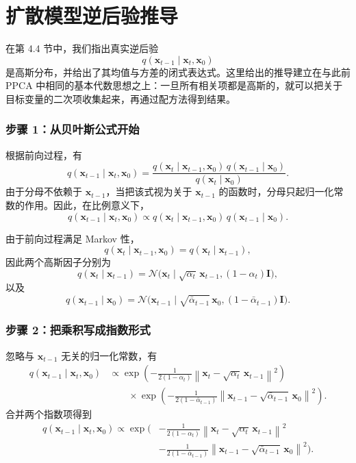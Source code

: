 \chapter{扩散模型逆后验推导}
\label{app:diffusion-posterior}

在第 4.4 节中，我们指出真实逆后验
\[
q(\mathbf{x}_{t-1}\mid \mathbf{x}_t,\mathbf{x}_0)
\]
是高斯分布，并给出了其均值与方差的闭式表达式。这里给出的推导建立在与此前 PPCA 中相同的基本代数思想之上：一旦所有相关项都是高斯的，就可以把关于目标变量的二次项收集起来，再通过配方法得到结果。

\subsection*{步骤 1：从贝叶斯公式开始}

根据前向过程，有
\[
q(\mathbf{x}_{t-1}\mid \mathbf{x}_t,\mathbf{x}_0)
=
\frac{
q(\mathbf{x}_t\mid \mathbf{x}_{t-1},\mathbf{x}_0)\,
q(\mathbf{x}_{t-1}\mid \mathbf{x}_0)
}{
q(\mathbf{x}_t\mid \mathbf{x}_0)
}.
\]
由于分母不依赖于 \(\mathbf{x}_{t-1}\)，当把该式视为关于 \(\mathbf{x}_{t-1}\) 的函数时，分母只起归一化常数的作用。因此，在比例意义下，
\[
q(\mathbf{x}_{t-1}\mid \mathbf{x}_t,\mathbf{x}_0)
\propto
q(\mathbf{x}_t\mid \mathbf{x}_{t-1},\mathbf{x}_0)\,
q(\mathbf{x}_{t-1}\mid \mathbf{x}_0).
\]

由于前向过程满足 Markov 性，
\[
q(\mathbf{x}_t\mid \mathbf{x}_{t-1},\mathbf{x}_0)
=
q(\mathbf{x}_t\mid \mathbf{x}_{t-1}),
\]
因此两个高斯因子分别为
\[
q(\mathbf{x}_t\mid \mathbf{x}_{t-1})
=
\mathcal{N}\!\bigl(
\mathbf{x}_t\mid
\sqrt{\alpha_t}\,\mathbf{x}_{t-1},
(1-\alpha_t)\mathbf{I}
\bigr),
\]
以及
\[
q(\mathbf{x}_{t-1}\mid \mathbf{x}_0)
=
\mathcal{N}\!\bigl(
\mathbf{x}_{t-1}\mid
\sqrt{\bar{\alpha}_{t-1}}\,\mathbf{x}_0,
(1-\bar{\alpha}_{t-1})\mathbf{I}
\bigr).
\]

\subsection*{步骤 2：把乘积写成指数形式}

忽略与 \(\mathbf{x}_{t-1}\) 无关的归一化常数，有
\[
\begin{aligned}
q(\mathbf{x}_{t-1}\mid \mathbf{x}_t,\mathbf{x}_0)
&\propto
\exp\!\left(
-\frac{1}{2(1-\alpha_t)}
\left\|
\mathbf{x}_t-\sqrt{\alpha_t}\,\mathbf{x}_{t-1}
\right\|^2
\right)
\\[4pt]
&\qquad\times
\exp\!\left(
-\frac{1}{2(1-\bar{\alpha}_{t-1})}
\left\|
\mathbf{x}_{t-1}-\sqrt{\bar{\alpha}_{t-1}}\,\mathbf{x}_0
\right\|^2
\right).
\end{aligned}
\]
合并两个指数项得到
\[
\begin{aligned}
q(\mathbf{x}_{t-1}\mid \mathbf{x}_t,\mathbf{x}_0)
\propto
\exp\!\Bigg(
&-\frac{1}{2(1-\alpha_t)}
\left\|
\mathbf{x}_t-\sqrt{\alpha_t}\,\mathbf{x}_{t-1}
\right\|^2
\\
&-\frac{1}{2(1-\bar{\alpha}_{t-1})}
\left\|
\mathbf{x}_{t-1}-\sqrt{\bar{\alpha}_{t-1}}\,\mathbf{x}_0
\right\|^2
\Bigg).
\end{aligned}
\]

